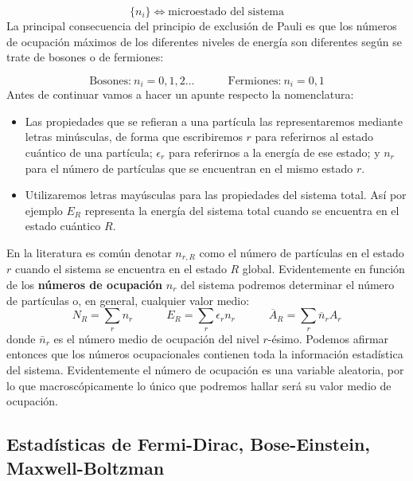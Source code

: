 \documentclass[12pt,a4paper]{article}
\numberwithin{equation}{section}
\numberwithin{figure}{section}
\newcommand{\tquad}{\quad \quad \quad}
\theoremstyle{definition}
\begin{document}
\begin{equation}
\{ n_i \} \Leftrightarrow \text{microestado del sistema}
\end{equation}
La principal consecuencia del principio de exclusión de Pauli es que los números de ocupación máximos de los diferentes niveles de energía son diferentes según se trate de bosones o de fermiones:

\begin{equation}
\text{Bosones:} \ n_i = 0,1,2\ldots   \tquad \text{Fermiones:} \ n_i=0,1
\end{equation}
 Antes de continuar vamos a hacer un apunte respecto la nomenclatura:

\begin{itemize}
\item Las propiedades que se refieran a una partícula las representaremos mediante letras minúsculas, de forma que escribiremos $r$ para referirnos al estado cuántico de una partícula; $\epsilon_r$ para referirnos a la energía de ese estado; y $n_r$ para el número de partículas que se encuentran en el mismo estado $r$. 
\item Utilizaremos letras mayúsculas para las propiedades del sistema total. Así por ejemplo $E_R$ representa la energía del sistema total cuando se encuentra en el estado cuántico $R$. 
\end{itemize}
En la literatura es común denotar $n_{r,R}$ como el número de partículas en el estado $r$ cuando el sistema se encuentra en el estado $R$ global. Evidentemente en función de los \textbf{números de ocupación} $n_r$ del sistema podremos determinar el número de partículas o, en general, cualquier valor medio:
\begin{equation}
N_R = \sum_r n_r \tquad E_R = \sum_r \epsilon_r n_r \tquad \overline{A}_R = \sum_r \overline{n}_r A_r
\end{equation}
donde $\bar{n}_r$ es el número medio de ocupación del nivel $r$-ésimo. Podemos afirmar entonces que los números ocupacionales contienen toda la información estadística del sistema. Evidentemente el número de ocupación es una variable aleatoria, por lo que macroscópicamente lo único que podremos hallar será su valor medio de ocupación. 



\subsection{Estadísticas de Fermi-Dirac, Bose-Einstein, Maxwell-Boltzman}
\end{document}
